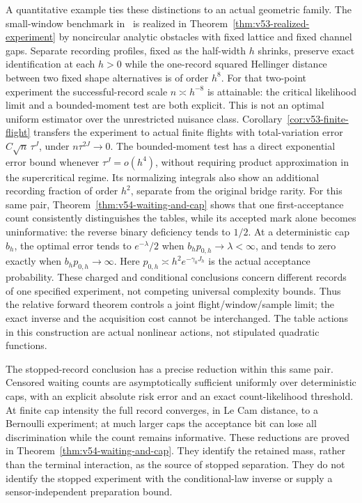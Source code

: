 A quantitative example ties these distinctions to an actual geometric
family.  The small-window benchmark in~\cite{A2ReviewV52} is realized in
Theorem~\ref{thm:v53-realized-experiment} by noncircular analytic obstacles
with fixed lattice and fixed channel gaps.  Separate recording profiles,
fixed as the half-width $h$ shrinks, preserve exact identification at each
$h>0$ while the one-record squared Hellinger distance between two fixed
shape alternatives is of order $h^8$.  For that two-point experiment the
successful-record scale $n\asymp h^{-8}$ is attainable: the critical
likelihood limit and a bounded-moment test are both explicit.  This is
not an optimal uniform estimator over the unrestricted nuisance class.
Corollary~\ref{cor:v53-finite-flight} transfers the experiment to actual
finite flights with total-variation error $C\sqrt n\,\tau^J$, under
$n\tau^{2J}\to0$.  The bounded-moment test has a direct exponential
error bound whenever $\tau^J=o(h^4)$, without requiring product
approximation in the supercritical regime.  Its normalizing integrals
also show an additional recording fraction of order $h^2$, separate
from the original bridge rarity.  For this same pair,
Theorem~\ref{thm:v54-waiting-and-cap} shows that one first-acceptance
count consistently distinguishes the tables, while its accepted mark
alone becomes uninformative: the reverse binary deficiency tends to
$1/2$.  At a deterministic cap $b_h$, the optimal error tends to
$e^{-\lambda}/2$ when $b_hp_{0,h}\to\lambda<\infty$, and tends to
zero exactly when $b_hp_{0,h}\to\infty$.  Here
$p_{0,h}\asymp h^2e^{-\gamma_0J_h}$ is the actual acceptance probability.
These charged and conditional conclusions concern different records of
one specified experiment, not competing universal complexity bounds.  Thus the relative forward theorem controls a
joint flight/window/sample limit; the exact inverse and the acquisition
cost cannot be interchanged.  The table actions in this construction are
actual nonlinear actions, not stipulated quadratic functions.

The stopped-record conclusion has a precise reduction within this same
pair.  Censored waiting counts are asymptotically sufficient uniformly
over deterministic caps, with an explicit absolute risk error and an
exact count-likelihood threshold.  At finite cap intensity the full
record converges, in Le Cam distance, to a Bernoulli experiment; at much
larger caps the acceptance bit can lose all discrimination while the
count remains informative.  These reductions are proved in
Theorem~\ref{thm:v54-waiting-and-cap}.  They identify the retained mass,
rather than the terminal interaction, as the source of stopped
separation.  They do not identify the stopped experiment with the
conditional-law inverse or supply a sensor-independent preparation bound.

